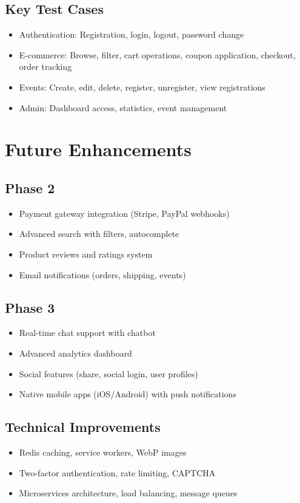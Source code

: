 \documentclass[11pt]{scrreprt}
\begin{document}
\section{Key Test Cases}
\begin{itemize}
\item Authentication: Registration, login, logout, password change
\item E-commerce: Browse, filter, cart operations, coupon application, checkout, order tracking
\item Events: Create, edit, delete, register, unregister, view registrations
\item Admin: Dashboard access, statistics, event management
\end{itemize}

\chapter{Future Enhancements}

\section{Phase 2}
\begin{itemize}
\item Payment gateway integration (Stripe, PayPal webhooks)
\item Advanced search with filters, autocomplete
\item Product reviews and ratings system
\item Email notifications (orders, shipping, events)
\end{itemize}

\section{Phase 3}
\begin{itemize}
\item Real-time chat support with chatbot
\item Advanced analytics dashboard
\item Social features (share, social login, user profiles)
\item Native mobile apps (iOS/Android) with push notifications
\end{itemize}

\section{Technical Improvements}
\begin{itemize}
\item Redis caching, service workers, WebP images
\item Two-factor authentication, rate limiting, CAPTCHA
\item Microservices architecture, load balancing, message queues
\end{itemize}
\end{document}
